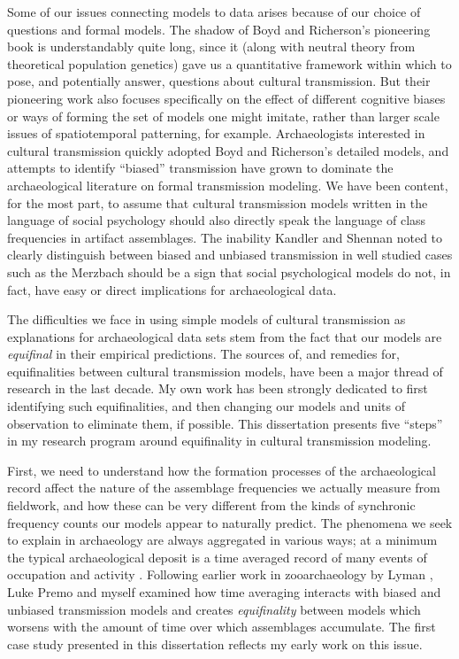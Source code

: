 Some of our issues connecting models to data arises because of our choice of questions and formal models.  The shadow of Boyd and Richerson's \citeyearpar{BR1985} pioneering book is understandably quite long, since it (along with neutral theory from theoretical population genetics) gave us a quantitative framework within which to pose, and potentially answer, questions about cultural transmission.  But their pioneering work also focuses specifically on the effect of different cognitive biases or ways of forming the set of models one might imitate, rather than larger scale issues of spatiotemporal patterning, for example.  Archaeologists interested in cultural transmission quickly adopted Boyd and Richerson's detailed models, and attempts to identify ``biased'' transmission have grown to dominate the archaeological literature on formal transmission modeling.  We have been content, for the most part, to assume that cultural transmission models written in the language of social psychology should also directly speak the language of class frequencies in artifact assemblages.  The inability Kandler and Shennan \citeyearpar{Kandler20150905} noted to clearly distinguish between biased and unbiased transmission in well studied cases such as the Merzbach should be a sign that social psychological models do not, in fact, have easy or direct implications for archaeological data.  

The difficulties we face in using simple models of cultural transmission as explanations for archaeological data sets stem from the fact that our models are \textit{equifinal} in their empirical predictions.  The sources of, and remedies for, equifinalities between cultural transmission models, have been a major thread of research in the last decade.  My own work has been strongly dedicated to first identifying such equifinalities, and then changing our models and units of observation to eliminate them, if possible.  This dissertation presents five ``steps'' in my research program around equifinality in cultural transmission modeling.  

First, we need to understand how the formation processes of the archaeological record affect the nature of the assemblage frequencies we actually measure from fieldwork, and how these can be very different from the kinds of synchronic frequency counts our models appear to naturally predict.  The phenomena we seek to explain in archaeology are always aggregated in various ways; at a minimum the typical archaeological deposit is a time averaged record of many events of occupation and activity \citep{bailey2007time,bailey1981concepts,binford1981behavioral,8981,stein1987deposits}.  Following earlier work in zooarchaeology by Lyman \citeyearpar{Lyman2003}, Luke Premo \citeyearpar{Premo2014} and myself \cite{Madsen2012TA} examined how time averaging interacts with biased and unbiased transmission models and creates \textit{equifinality} between models which worsens with the amount of time over which assemblages accumulate.  The first case study presented in this dissertation reflects my early work on this issue.

